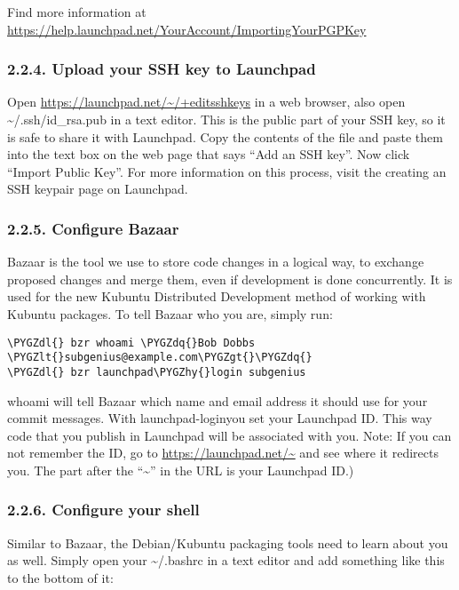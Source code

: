 \documentclass[letterpaper,10pt,english]{sphinxmanual}
\def\PYGZlt{\char`\<}
\def\PYGZgt{\char`\>}
\def\PYGZdl{\char`\$}
\def\PYGZhy{\char`\-}
\def\PYGZdq{\char`\"}
\begin{document}
Find more information at \url{https://help.launchpad.net/YourAccount/ImportingYourPGPKey}


\subsubsection{2.2.4. Upload your SSH key to Launchpad}
\label{docs/packaging_guide/getting_started:upload-your-ssh-key-to-launchpad}
Open \url{https://launchpad.net/~/+editsshkeys} in a web browser, also open \textasciitilde{}/.ssh/id\_rsa.pub in a text editor. This is the public part of your SSH key, so it is safe to share it with Launchpad. Copy the contents of the file and paste them into the text box on the web page that says “Add an SSH key”. Now click “Import Public Key”.
For more information on this process, visit the creating an SSH keypair page on Launchpad.


\subsubsection{2.2.5. Configure Bazaar}
\label{docs/packaging_guide/getting_started:configure-bazaar}
Bazaar is the tool we use to store code changes in a logical way, to exchange proposed changes and merge them, even if development is done concurrently. It is used for the new Kubuntu Distributed Development method of working with Kubuntu packages.
To tell Bazaar who you are, simply run:

\begin{Verbatim}[commandchars=\\\{\}]
\PYGZdl{} bzr whoami \PYGZdq{}Bob Dobbs \PYGZlt{}subgenius@example.com\PYGZgt{}\PYGZdq{}
\PYGZdl{} bzr launchpad\PYGZhy{}login subgenius
\end{Verbatim}

whoami will tell Bazaar which name and email address it should use for your commit messages. With launchpad-loginyou set your Launchpad ID. This way code that you publish in Launchpad will be associated with you.
Note: If you can not remember the ID, go to \url{https://launchpad.net/~} and see where it redirects you. The part after the “\textasciitilde{}” in the URL is your Launchpad ID.)


\subsubsection{2.2.6. Configure your shell}
\label{docs/packaging_guide/getting_started:configure-your-shell}
Similar to Bazaar, the Debian/Kubuntu packaging tools need to learn about you as well. Simply open your \textasciitilde{}/.bashrc in a text editor and add something like this to the bottom of it:
\end{document}

